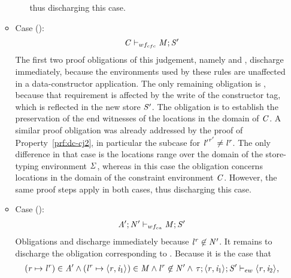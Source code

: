 \begin{nproof}
\begin{bcase}
\begin{itemize}
\begin{itemize}
\begin{itemize}
      thus discharging this case.
      \end{itemize}
      \item Case ():
      \begin{align*}
      \mathit{C} \vdash_{wf_{cfc}} \mathit{M};\mathit{S}'
      \end{align*}
      The first two proof obligations of this judgement, namely  and , discharge immediately, because the environments used by these
      rules are unaffected in a data-constructor application.
      The only remaining obligation is , because that requirement is affected by the write of the constructor tag, which is reflected in the new store $\mathit{S}'$.
      The obligation is to establish the preservation of the
      end witnesses of the locations in the domain of $\mathit{C}$.
      A similar proof obligation was already addressed by the proof of Property~\ref{prf:dc-cj2},
      in particular the subcase for ${\mathit{l}'}^{\mathit{r}'} \neq {\mathit{l}}^{\mathit{r}}$.
      The only difference in that case is the locations range over the
      domain of the store-typing environment $\mathit{\Sigma}$, whereas in this case
      the obligation concerns locations
      in the domain of the constraint environment $\mathit{C}$.
      However, the same proof steps apply in both cases, thus discharging
      this case.
      \item Case ():
      \begin{align*}
      \mathit{A}';\mathit{N}' \vdash_{wf_{ca}} \mathit{M};\mathit{S}'
      \end{align*}
      Obligations  and
       discharge immediately
      because ${\mathit{l}}^{\mathit{r}} \not \in \mathit{N}'$.
      It remains to discharge the obligation corresponding to
      .
      Because it is the case that
      \begin{align*}
      (\reg \mapsto \locreg{\loc}{\reg}) \in \AENV' \wedge
      (\locreg{\loc}{\reg} \mapsto \concreteloc{\reg}{\ind_1}{}) \in \MENV \wedge \locreg{\loc}{\reg} \not \in \NENV' \wedge
    \, \ewitness{\TYP}{\concreteloc{\reg}{\ind_1}{}}{\STOR'}{\concreteloc{\reg}{\ind_2}{}},

\end{align*}
\end{itemize}
\end{itemize}
\end{bcase}
\end{nproof}
